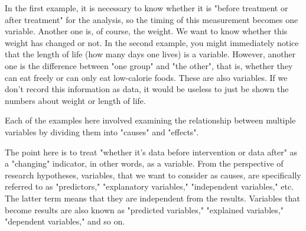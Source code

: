 \documentclass{ltjsbook}
\begin{document}
In the first example, it is necessary to know whether it is "before treatment or after treatment" for the analysis, so the timing of this measurement becomes one variable. Another one is, of course, the weight. We want to know whether this weight has changed or not. In the second example, you might immediately notice that the length of life (how many days one lives) is a variable. However, another one is the difference between "one group" and "the other", that is, whether they can eat freely or can only eat low-calorie foods. These are also variables. If we don't record this information as data, it would be useless to just be shown the numbers about weight or length of life.

Each of the examples here involved examining the relationship between multiple variables by dividing them into "causes" and "effects".

The point here is to treat "whether it's data before intervention or data after" as a "changing" indicator, in other words, as a variable. From the perspective of research hypotheses, variables, that we want to consider as causes, are specifically referred to as "predictors," "explanatory variables," "independent variables," etc. The latter term means that they are independent from the results. Variables that become results are also known as "predicted variables," "explained variables," "dependent variables," and so on.
\end{document}
